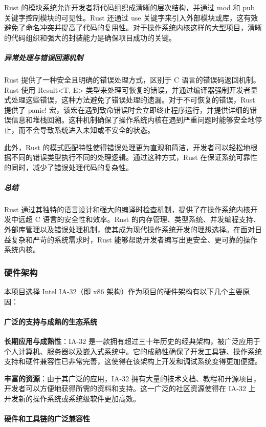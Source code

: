 Rust 的模块系统允许开发者将代码组织成清晰的层次结构，并通过 mod 和 pub 关键字控制模块的可见性。Rust 还通过 use 关键字来引入外部模块或库，这有效避免了命名冲突并提高了代码的复用性。对于操作系统内核这样的大型项目，清晰的代码组织和强大的封装能力是确保项目成功的关键。

\subparagraph{异常处理与错误回溯机制}

Rust 提供了一种安全且明确的错误处理方式，区别于 C 语言的错误码返回机制。Rust 使用 Result<T, E> 类型来处理可恢复的错误，并通过编译器强制开发者显式处理这些错误，这种方法避免了错误处理的遗漏。对于不可恢复的错误，Rust 提供了 panic! 宏，该宏在遇到致命错误时会立即终止程序运行，并提供详细的错误信息和堆栈回溯。这种机制确保了操作系统内核在遇到严重问题时能够安全地停止，而不会导致系统进入未知或不安全的状态。

此外，Rust 的模式匹配特性使得错误处理更为直观和简洁，开发者可以轻松地根据不同的错误类型执行不同的处理逻辑。通过这种方式，Rust 在保证系统可靠性的同时，减少了错误处理代码的复杂性。

\subparagraph{总结}

Rust 通过其独特的语言设计和强大的编译时检查机制，提供了在操作系统内核开发中远超 C 语言的安全性和效率。Rust 的内存管理、类型系统、并发编程支持、外部库管理以及错误处理机制，使其成为现代操作系统开发的理想选择。在面对日益复杂和严苛的系统需求时，Rust 能够帮助开发者编写出更安全、更可靠的操作系统内核。

\subsubsection{硬件架构}

本项目选择 Intel IA-32（即 x86 架构）作为项目的硬件架构有以下几个主要原因：

\paragraph{广泛的支持与成熟的生态系统}

\textbf{长期应用与成熟性}：IA-32 是一款拥有超过三十年历史的经典架构，被广泛应用于个人计算机、服务器以及嵌入式系统中。它的成熟性确保了开发工具链、操作系统支持和硬件兼容性已非常完善，这使得在该架构上开发和调试系统变得更加便捷。

\textbf{丰富的资源}：由于其广泛的应用，IA-32 拥有大量的技术文档、教程和开源项目，开发者可以方便地获得所需的资料和支持。这一广泛的社区资源使得在 IA-32 上开发新的操作系统或系统级软件更加高效。

\paragraph{硬件和工具链的广泛兼容性}

